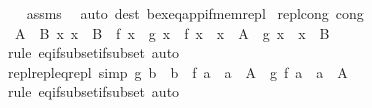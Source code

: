\begin{isabellebody}
%
\isadelimproof
\ \ %
\endisadelimproof
%
\isatagproof
{}\isamarkupfalse%
\ assms\ \isamarkupfalse%
\ {\isacharparenleft}{\kern0pt}auto\ dest{\isacharcolon}{\kern0pt}\ bex{\isacharunderscore}{\kern0pt}eq{\isacharunderscore}{\kern0pt}app{\isacharunderscore}{\kern0pt}if{\isacharunderscore}{\kern0pt}mem{\isacharunderscore}{\kern0pt}repl{\isacharparenright}{\kern0pt}%
\endisatagproof
{\isafoldproof}%
%
\isadelimproof
\isanewline
%
\endisadelimproof
\isanewline
{}\isamarkupfalse%
\ repl{\isacharunderscore}{\kern0pt}cong\ {\isacharbrackleft}{\kern0pt}cong{\isacharbrackright}{\kern0pt}{\isacharcolon}{\kern0pt}\isanewline
\ \ {\isachardoublequoteopen}{\isasymlbrakk}A\ {\isacharequal}{\kern0pt}\ B{\isacharsemicolon}{\kern0pt}\ {\isasymAnd}x{\isachardot}{\kern0pt}\ x\ {\isasymin}\ B\ {\isasymLongrightarrow}\ f\ x\ {\isacharequal}{\kern0pt}\ g\ x{\isasymrbrakk}\ {\isasymLongrightarrow}\ {\isacharbraceleft}{\kern0pt}f\ x\ {\isacharbar}{\kern0pt}\ x\ {\isasymin}\ A{\isacharbraceright}{\kern0pt}\ {\isacharequal}{\kern0pt}\ {\isacharbraceleft}{\kern0pt}g\ x\ {\isacharbar}{\kern0pt}\ x\ {\isasymin}\ B{\isacharbraceright}{\kern0pt}{\isachardoublequoteclose}\isanewline
%
\isadelimproof
\ \ %
\endisadelimproof
%
\isatagproof
{}\isamarkupfalse%
\ {\isacharparenleft}{\kern0pt}rule\ eq{\isacharunderscore}{\kern0pt}if{\isacharunderscore}{\kern0pt}subset{\isacharunderscore}{\kern0pt}if{\isacharunderscore}{\kern0pt}subset{\isacharparenright}{\kern0pt}\ auto%
\endisatagproof
{\isafoldproof}%
%
\isadelimproof
\isanewline
%
\endisadelimproof
\isanewline
{}\isamarkupfalse%
\ repl{\isacharunderscore}{\kern0pt}repl{\isacharunderscore}{\kern0pt}eq{\isacharunderscore}{\kern0pt}repl\ {\isacharbrackleft}{\kern0pt}simp{\isacharbrackright}{\kern0pt}{\isacharcolon}{\kern0pt}\ {\isachardoublequoteopen}{\isacharbraceleft}{\kern0pt}g\ b\ {\isacharbar}{\kern0pt}\ b\ {\isasymin}\ {\isacharbraceleft}{\kern0pt}f\ a\ {\isacharbar}{\kern0pt}\ a\ {\isasymin}\ A{\isacharbraceright}{\kern0pt}{\isacharbraceright}{\kern0pt}\ {\isacharequal}{\kern0pt}\ {\isacharbraceleft}{\kern0pt}g\ {\isacharparenleft}{\kern0pt}f\ a{\isacharparenright}{\kern0pt}\ {\isacharbar}{\kern0pt}\ a\ {\isasymin}\ A{\isacharbraceright}{\kern0pt}{\isachardoublequoteclose}\isanewline
%
\isadelimproof
\ \ %
\endisadelimproof
%
\isatagproof
{}\isamarkupfalse%
\ {\isacharparenleft}{\kern0pt}rule\ eq{\isacharunderscore}{\kern0pt}if{\isacharunderscore}{\kern0pt}subset{\isacharunderscore}{\kern0pt}if{\isacharunderscore}{\kern0pt}subset{\isacharparenright}{\kern0pt}\ auto%

\end{isabellebody}
